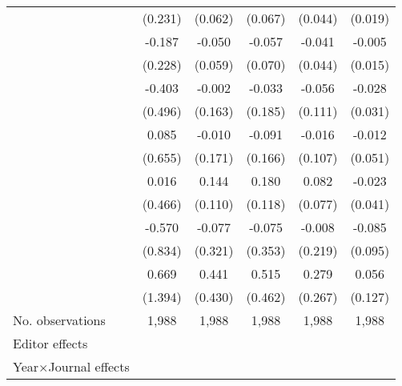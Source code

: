 \begin{table}
\begin{threeparttable}
\begin{tabular}{p{3cm}S@{}S@{}S@{}S@{}S@{}}
                                          &     (0.231)   &     (0.062)   &     (0.067)   &     (0.044)   &     (0.019)   \\
            &      -0.187   &      -0.050   &      -0.057   &      -0.041   &      -0.005   \\
                                          &     (0.228)   &     (0.059)   &     (0.070)   &     (0.044)   &     (0.015)   \\
                &      -0.403   &      -0.002   &      -0.033   &      -0.056   &      -0.028   \\
                                          &     (0.496)   &     (0.163)   &     (0.185)   &     (0.111)   &     (0.031)   \\
                        &       0.085   &      -0.010   &      -0.091   &      -0.016   &      -0.012   \\
                                          &     (0.655)   &     (0.171)   &     (0.166)   &     (0.107)   &     (0.051)   \\
                     &       0.016   &       0.144   &       0.180   &       0.082   &      -0.023   \\
                                          &     (0.466)   &     (0.110)   &     (0.118)   &     (0.077)   &     (0.041)   \\
                         &      -0.570   &      -0.077   &      -0.075   &      -0.008   &      -0.085   \\
                                          &     (0.834)   &     (0.321)   &     (0.353)   &     (0.219)   &     (0.095)   \\
                      &       0.669   &       0.441   &       0.515   &       0.279   &       0.056   \\
                                          &     (1.394)   &     (0.430)   &     (0.462)   &     (0.267)   &     (0.127)   \\
            \midrule
            No. observations              &       1,988   &       1,988   &       1,988   &       1,988   &       1,988   \\
            \midrule
            Editor effects       &           {}   &           {}   &           {}   &           {}   &           {}   \\
            Year\(\times\)Journal effects          &           {}   &           {}   &           {}   &           {}   &           {}   \\

\end{tabular}
\end{threeparttable}
\end{table}
